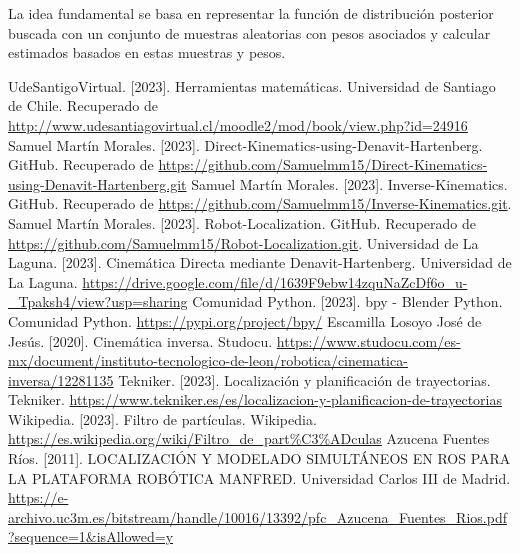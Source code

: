 \documentclass[11pt]{report}
\begin{document}
La idea fundamental se basa en representar la función de distribución posterior buscada con un conjunto de muestras aleatorias con pesos asociados y calcular estimados basados en estas muestras y pesos.

\begin{thebibliography}{99}
   UdeSantigoVirtual. [2023]. Herramientas matemáticas. Universidad de Santiago de Chile. Recuperado de \url{http://www.udesantiagovirtual.cl/moodle2/mod/book/view.php?id=24916}
   Samuel Martín Morales. [2023]. Direct-Kinematics-using-Denavit-Hartenberg. GitHub. Recuperado de \url{https://github.com/Samuelmm15/Direct-Kinematics-using-Denavit-Hartenberg.git}
   Samuel Martín Morales. [2023]. Inverse-Kinematics. GitHub. Recuperado de \url{https://github.com/Samuelmm15/Inverse-Kinematics.git}.
   Samuel Martín Morales. [2023]. Robot-Localization. GitHub. Recuperado de \url{https://github.com/Samuelmm15/Robot-Localization.git}.
   Universidad de La Laguna. [2023]. Cinemática Directa mediante Denavit-Hartenberg. Universidad de La Laguna. \url{https://drive.google.com/file/d/1639F9ebw14zquNaZcDf6o_u-_Tpaksh4/view?usp=sharing}
   Comunidad Python. [2023]. bpy - Blender Python. Comunidad Python. \url{https://pypi.org/project/bpy/}
   Escamilla Losoyo José de Jesús. [2020]. Cinemática inversa. Studocu. \url{https://www.studocu.com/es-mx/document/instituto-tecnologico-de-leon/robotica/cinematica-inversa/12281135}
   Tekniker. [2023]. Localización y planificación de trayectorias. Tekniker. \url{https://www.tekniker.es/es/localizacion-y-planificacion-de-trayectorias}
   Wikipedia. [2023]. Filtro de partículas. Wikipedia. \url{https://es.wikipedia.org/wiki/Filtro_de_part%C3%ADculas}
   Azucena Fuentes Ríos. [2011]. LOCALIZACIÓN Y MODELADO SIMULTÁNEOS
  EN ROS PARA LA PLATAFORMA ROBÓTICA
  MANFRED. Universidad Carlos III de Madrid. \url{https://e-archivo.uc3m.es/bitstream/handle/10016/13392/pfc_Azucena_Fuentes_Rios.pdf?sequence=1&isAllowed=y}
\end{thebibliography}
\end{document}
